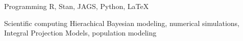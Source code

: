 

\begin{cvskills}

  \cvskill
    {Programming} %
    {R, Stan, JAGS, Python, LaTeX} %
 

  \cvskill
    {Scientific computing} %
    {Hierachical Bayesian modeling, numerical simulations, Integral Projection Models, population modeling} %

\end{cvskills}
